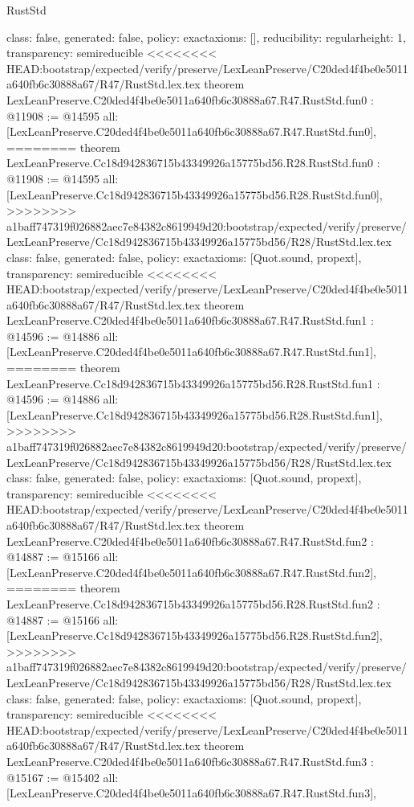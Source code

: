 \begin{lexlean}{RustStd}
\begin{coremodule}
{\begin{coremodule}
{{{  class: false,
  generated: false,
  policy: exact{axioms: []},
  reducibility: regular{height: 1},
  transparency: semireducible
}
<<<<<<<< HEAD:bootstrap/expected/verify/preserve/LexLeanPreserve/C20ded4f4be0e5011a640fb6c30888a67/R47/RustStd.lex.tex
theorem LexLeanPreserve.C20ded4f4be0e5011a640fb6c30888a67.R47.RustStd.fun0 : @11908 := @14595 {
  all: [LexLeanPreserve.C20ded4f4be0e5011a640fb6c30888a67.R47.RustStd.fun0],
========
theorem LexLeanPreserve.Cc18d942836715b43349926a15775bd56.R28.RustStd.fun0 : @11908 := @14595 {
  all: [LexLeanPreserve.Cc18d942836715b43349926a15775bd56.R28.RustStd.fun0],
>>>>>>>> a1baff747319f026882aec7e84382c8619949d20:bootstrap/expected/verify/preserve/LexLeanPreserve/Cc18d942836715b43349926a15775bd56/R28/RustStd.lex.tex
  class: false,
  generated: false,
  policy: exact{axioms: [Quot.sound, propext]},
  transparency: semireducible
}
<<<<<<<< HEAD:bootstrap/expected/verify/preserve/LexLeanPreserve/C20ded4f4be0e5011a640fb6c30888a67/R47/RustStd.lex.tex
theorem LexLeanPreserve.C20ded4f4be0e5011a640fb6c30888a67.R47.RustStd.fun1 : @14596 := @14886 {
  all: [LexLeanPreserve.C20ded4f4be0e5011a640fb6c30888a67.R47.RustStd.fun1],
========
theorem LexLeanPreserve.Cc18d942836715b43349926a15775bd56.R28.RustStd.fun1 : @14596 := @14886 {
  all: [LexLeanPreserve.Cc18d942836715b43349926a15775bd56.R28.RustStd.fun1],
>>>>>>>> a1baff747319f026882aec7e84382c8619949d20:bootstrap/expected/verify/preserve/LexLeanPreserve/Cc18d942836715b43349926a15775bd56/R28/RustStd.lex.tex
  class: false,
  generated: false,
  policy: exact{axioms: [Quot.sound, propext]},
  transparency: semireducible
}
<<<<<<<< HEAD:bootstrap/expected/verify/preserve/LexLeanPreserve/C20ded4f4be0e5011a640fb6c30888a67/R47/RustStd.lex.tex
theorem LexLeanPreserve.C20ded4f4be0e5011a640fb6c30888a67.R47.RustStd.fun2 : @14887 := @15166 {
  all: [LexLeanPreserve.C20ded4f4be0e5011a640fb6c30888a67.R47.RustStd.fun2],
========
theorem LexLeanPreserve.Cc18d942836715b43349926a15775bd56.R28.RustStd.fun2 : @14887 := @15166 {
  all: [LexLeanPreserve.Cc18d942836715b43349926a15775bd56.R28.RustStd.fun2],
>>>>>>>> a1baff747319f026882aec7e84382c8619949d20:bootstrap/expected/verify/preserve/LexLeanPreserve/Cc18d942836715b43349926a15775bd56/R28/RustStd.lex.tex
  class: false,
  generated: false,
  policy: exact{axioms: [Quot.sound, propext]},
  transparency: semireducible
}
<<<<<<<< HEAD:bootstrap/expected/verify/preserve/LexLeanPreserve/C20ded4f4be0e5011a640fb6c30888a67/R47/RustStd.lex.tex
theorem LexLeanPreserve.C20ded4f4be0e5011a640fb6c30888a67.R47.RustStd.fun3 : @15167 := @15402 {
  all: [LexLeanPreserve.C20ded4f4be0e5011a640fb6c30888a67.R47.RustStd.fun3],
}}}}}}
\end{coremodule}}
\end{coremodule}
\end{lexlean}
